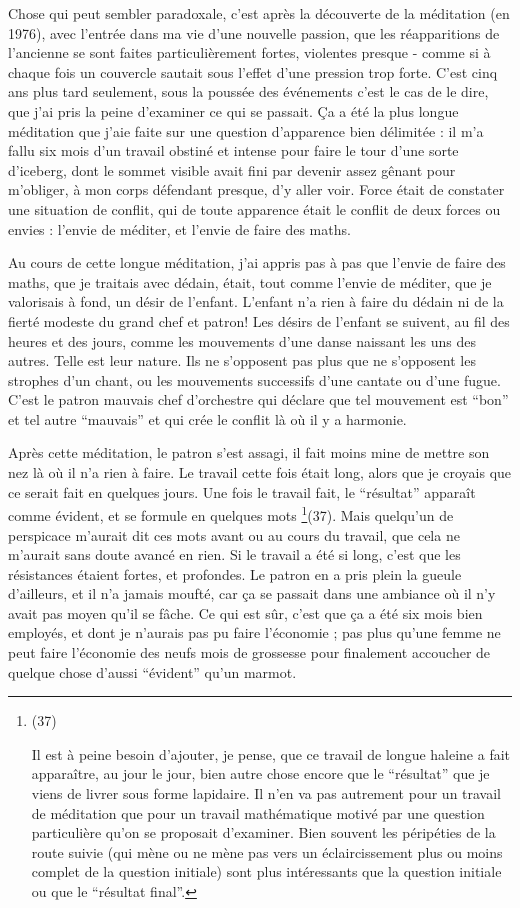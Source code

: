Chose qui peut sembler paradoxale, c'est après la découverte de la méditation (en 1976), avec l'entrée dans ma vie d'une nouvelle passion, que les réapparitions de l'ancienne se sont faites particulièrement fortes, violentes presque - comme si à chaque fois un couvercle sautait sous l'effet d'une pression trop forte. C'est cinq ans plus tard seulement, sous la poussée des événements c'est le cas de le dire, que j'ai pris la peine d'examiner ce qui se passait. Ça a été la plus longue méditation que j'aie faite sur une question d'apparence bien délimitée : il m'a fallu six mois d'un travail obstiné et intense pour faire le tour d'une sorte d'iceberg, dont le sommet visible avait fini par devenir assez gênant pour m'obliger, à mon corps défendant presque, d'y aller voir. Force était de constater une situation de conflit, qui de toute apparence était le conflit de deux forces ou envies : l'envie de méditer, et l'envie de faire des maths.

Au cours de cette longue méditation, j'ai appris pas à pas que l'envie de faire des maths, que je traitais avec dédain, était, tout comme l'envie de méditer, que je valorisais à fond, un désir de l'enfant. L'enfant n'a rien à faire du dédain ni de la fierté modeste du grand chef et patron! Les désirs de l'enfant se suivent, au fil des heures et des jours, comme les mouvements d'une danse naissant les uns des autres. Telle est leur nature. Ils ne s'opposent pas plus que ne s'opposent les strophes d'un chant, ou les mouvements successifs d'une cantate ou d'une fugue. C'est le patron mauvais chef d'orchestre qui déclare que tel mouvement est ``bon'' et tel autre ``mauvais'' et qui crée le conflit là où il y a harmonie.

Après cette méditation, le patron s'est assagi, il fait moins mine de mettre son nez là où il n'a rien à faire. Le travail cette fois était long, alors que je croyais que ce serait fait en quelques jours. Une fois le travail fait, le ``résultat'' apparaît comme évident, et se formule en quelques mots \footnote{(37) \par Il est à peine besoin d'ajouter, je pense, que ce travail de longue haleine a fait apparaître, au jour le jour, bien autre chose encore que le ``résultat'' que je viens de livrer sous forme lapidaire. Il n'en va pas autrement pour un travail de méditation que pour un travail mathématique motivé par une question particulière qu'on se proposait d'examiner. Bien souvent les péripéties de la route suivie (qui mène ou ne mène pas vers un éclaircissement plus ou moins complet de la question initiale) sont plus intéressants que la question initiale ou que le ``résultat final''.}(37). Mais quelqu'un de perspicace m'aurait dit ces mots avant ou au cours du travail, que cela ne m'aurait sans doute avancé en rien. Si le travail a été si long, c'est que les résistances étaient fortes, et profondes. Le patron en a pris plein la gueule d'ailleurs, et il n'a jamais moufté, car ça se passait dans une ambiance où il n'y avait pas moyen qu'il se fâche. Ce qui est sûr, c'est que ça a été six mois bien employés, et dont je n'aurais pas pu faire l'économie ; pas plus qu'une femme ne peut faire l'économie des neufs mois de grossesse pour finalement accoucher de quelque chose d'aussi ``évident'' qu'un marmot.